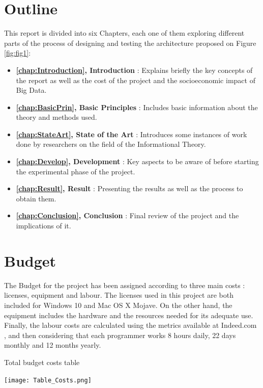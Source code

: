 
\section{Outline}

This report is divided into six Chapters, each one of them exploring different parts of the process of designing and testing the architecture proposed on Figure \ref{fig:fig1}:

\begin{itemize}
	\item \textbf{ \autoref{chap:Introduction}, Introduction} : Explains briefly the key concepts of the report as well as the cost of the project and the socioeconomic impact of Big Data.
	
	\item \textbf{ \autoref{chap:BasicPrin}, Basic Principles} : Includes basic information about the theory and methods used.
	
	\item \textbf{ \autoref{chap:StateArt}, State of the Art} : Introduces some instances of work done by researchers on the field of the Informational Theory.

	\item \textbf{ \autoref{chap:Develop}, Development} : Key aspects to be aware of before starting the experimental phase of the project.
	
	\item \textbf{ \autoref{chap:Result}, Result} : Presenting the results as well as the process to obtain them.
	
	\item \textbf{ \autoref{chap:Conclusion}, Conclusion} : Final review of the project and the implications of it.
	
\end{itemize}

\section{Budget}

The Budget for the project has been assigned according to three main costs : licenses, equipment and labour. The licenses used in this project are both included for Windows 10 and Mac OS X Mojave. On the other hand, the equipment includes the hardware and the resources needed for its adequate use. Finally, the labour costs are calculated using the metrics available at Indeed.com \cite{ProgrammerSalaries}, and then considering that each programmer works 8 hours daily, 22 days monthly and 12 months yearly. \par
\begin{table}[H]
	\caption{Total budget costs table}
	\label{tbl:budget_table}
    \texttt{[image: Table\_Costs.png]}
\end{table}

